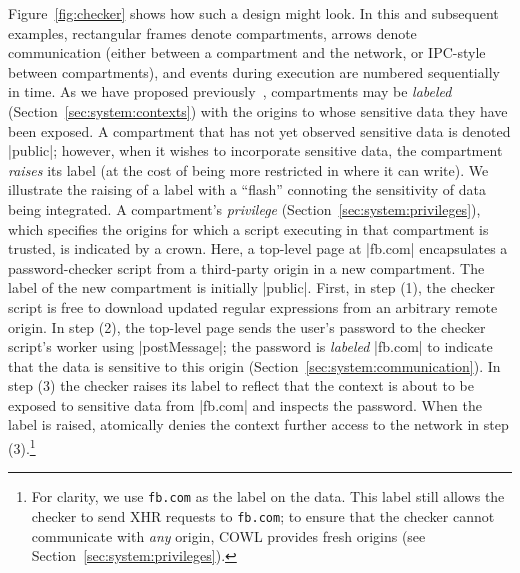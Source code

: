 Figure~\ref{fig:checker} shows how such a design might look. In this
and subsequent examples, rectangular frames denote compartments,
arrows denote communication (either between a compartment and the
network, or IPC-style between compartments), and events during
execution are numbered sequentially in time. As we have proposed
previously~\cite{yang:2013:towards}, compartments may be
\emph{labeled} (Section~\ref{sec:system:contexts}) with the origins to
whose sensitive data they have been exposed. A compartment that has
not yet observed sensitive data is denoted \js|public|; however, when
it wishes to incorporate sensitive data, the compartment \emph{raises}
its label (at the cost of being more restricted in where it can
write). We illustrate the raising of a label with a ``flash''
connoting the sensitivity of data being integrated.  A compartment's
\emph{privilege} (Section~\ref{sec:system:privileges}), which specifies the
origins for which a script executing in that compartment is trusted,
is indicated by a crown. Here, a top-level page at \js|fb.com|
encapsulates a password-checker script from a third-party origin in a
new compartment. The label of the new compartment is initially
\js|public|.
First, in step (1), the checker script is free to
download updated regular expressions from an arbitrary remote
origin. In step (2), the top-level page sends the user's password to
the checker script's worker using \js|postMessage|; the password is
\emph{labeled} \js|fb.com| to indicate that the data is sensitive to
this origin (Section~\ref{sec:system:communication}).
%
%
In step (3) the checker raises its label to reflect that the context
is about to be exposed to sensitive data from \js|fb.com| and
inspects the password.
%
When the label is raised, \sys{} atomically denies the context further
access to the network in step (3).\footnote{
  For clarity, we use \texttt{fb.com} as the label on the data.  This
  label still allows the checker to send XHR requests to
  \texttt{fb.com}; to ensure that the checker cannot communicate with
  \emph{any} origin, COWL provides fresh origins (see
  Section~\ref{sec:system:privileges}).
}
